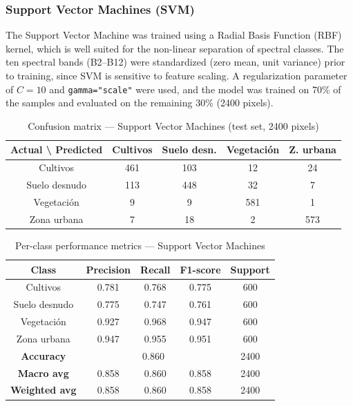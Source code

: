 \subsubsection{Support Vector Machines (SVM)}

The Support Vector Machine was trained using a Radial Basis Function
(RBF) kernel, which is well suited for the non-linear separation of
spectral classes. The ten spectral bands (B2--B12) were standardized
(zero mean, unit variance) prior to training, since SVM is sensitive
to feature scaling. A regularization parameter of $C=10$ and
\texttt{gamma="scale"} were used, and the model was trained on 70\% of
the samples and evaluated on the remaining 30\% (2400 pixels).

\begin{table}[H]
\centering
\begin{tabular}{|c|c|c|c|c|}
\hline
\textbf{Actual \textbackslash{} Predicted} & \textbf{Cultivos} & \textbf{Suelo desn.} & \textbf{Vegetaci\'on} & \textbf{Z. urbana} \\
\hline
Cultivos       & 461 & 103 & 12  & 24  \\
\hline
Suelo desnudo  & 113 & 448 & 32  & 7   \\
\hline
Vegetaci\'on   & 9   & 9   & 581 & 1   \\
\hline
Zona urbana    & 7   & 18  & 2   & 573 \\
\hline
\end{tabular}
\caption{Confusion matrix --- Support Vector Machines (test set, 2400 pixels)}
\end{table}

\begin{table}[H]
\centering
\begin{tabular}{|c|c|c|c|c|}
\hline
\textbf{Class} & \textbf{Precision} & \textbf{Recall} & \textbf{F1-score} & \textbf{Support} \\
\hline
Cultivos       & 0.781 & 0.768 & 0.775 & 600 \\
\hline
Suelo desnudo  & 0.775 & 0.747 & 0.761 & 600 \\
\hline
Vegetaci\'on   & 0.927 & 0.968 & 0.947 & 600 \\
\hline
Zona urbana    & 0.947 & 0.955 & 0.951 & 600 \\
\hline
\textbf{Accuracy}     & \multicolumn{3}{c|}{0.860} & 2400 \\
\hline
\textbf{Macro avg}    & 0.858 & 0.860 & 0.858 & 2400 \\
\hline
\textbf{Weighted avg} & 0.858 & 0.860 & 0.858 & 2400 \\
\hline
\end{tabular}
\caption{Per-class performance metrics --- Support Vector Machines}
\end{table}

